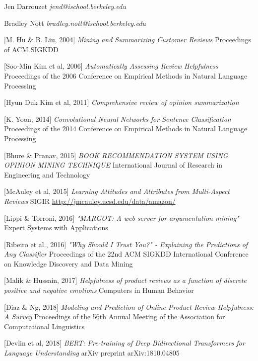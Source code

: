 \documentclass[10pt, a4paper, twocolumn]{article}
\begin{document}
\nocite {yoon_2014,tf_movie_demo,lee_2019,nainan_2019}


\begin{thebibliography}{1}

 Jen  Darrouzet {\em jend@ischool.berkeley.edu}

 Bradley Nott {\em bradley.nott@ischool.berkeley.edu}

 [M. Hu \& B. Liu, 2004] {\em Mining and Summarizing Customer Reviews} Proceedings of ACM SIGKDD

 [Soo-Min Kim et al, 2006] {\em Automatically Assessing Review Helpfulness} Proceedings of the 2006 Conference on Empirical Methods in Natural Language Processing

 [Hyun Duk Kim et al, 2011] {\em Comprehensive review of opinion summarization}

 [K. Yoon, 2014] {\em Convolutional Neural Networks for Sentence Classification} Proceedings of the 2014 Conference on Empirical Methods in Natural Language Processing

 [Bhure \& Pranav, 2015] {\em BOOK RECOMMENDATION SYSTEM USING OPINION MINING TECHNIQUE} International Journal of Research in Engineering and Technology

 [McAuley et al, 2015] {\em Learning Attitudes and Attributes from Multi-Aspect Reviews} SIGIR \url{http://jmcauley.ucsd.edu/data/amazon/}

 [Lippi \& Torroni, 2016] {\em "MARGOT: A web server for argumentation mining"} Expert Systems with Applications

 [Ribeiro et al., 2016] {\em "Why Should {I} Trust You?" - Explaining the Predictions of Any Classifier} Proceedings of the 22nd {ACM} {SIGKDD} International Conference on Knowledge Discovery and Data Mining

[Malik \& Hussain, 2017] {\em Helpfulness of product reviews as a function of discrete positive and negative emotions} Computers in Human Behavior

 [Diaz \& Ng, 2018] {\em Modeling and Prediction of Online Product Review Helpfulness: A Survey} Proceedings of the 56th Annual Meeting of the Association for Computational Linguistics

 [Devlin et al, 2018] {\em BERT: Pre-training of Deep Bidirectional Transformers for Language Understanding} arXiv preprint arXiv:1810.04805


\end{thebibliography}
\end{document}
